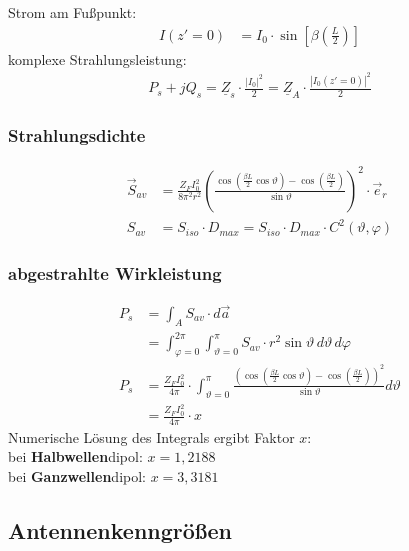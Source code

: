 Strom am Fußpunkt:
\begin{align*}
	I(z'=0) & = I_0\cdot\sin\left[\beta\left(\frac{L}{2}\right)\right]
\end{align*}
komplexe Strahlungsleistung:
\begin{align*}
	P_s +jQ_s = \underline{Z}_s\cdot \frac{|I_0|^2}{2} = \underline{Z}_A \cdot \frac{|I_0(z'=0)|^2}{2}
\end{align*}
\subsubsection{Strahlungsdichte}
\begin{align*}
    \vec{S}_{av} & = \frac{Z_FI_0^2}{8\pi^2 r^2}\left(\frac{\cos\left(\frac{\beta L}{2}\cos\vartheta\right)-\cos\left(\frac{\beta L}{2}\right)}{\sin\vartheta}\right)^2\cdot\vec{e}_r                               \\
    S_{av} & = S_{iso} \cdot D_{max} = S_{iso} \cdot D_{max} \cdot C^2(\vartheta, \varphi)
\end{align*}
\subsubsection{abgestrahlte Wirkleistung}
\begin{align*}
                P_{s} & = \int_A S_{av}\cdot d\vec{a}                                                                                                                                                              \\
                 & = \int^{2\pi}_{\varphi = 0}\int^{\pi}_{\vartheta = 0} S_{av}\cdot r^2 \sin\vartheta \, d\vartheta \, d\varphi\\
 P_{s}          & = \frac{Z_{F}I_0^2}{4\pi}\cdot\int^{\pi}_{\vartheta=0}\frac{\left(\cos\left(\frac{\beta L}{2}\cos\vartheta\right)-\cos\left(\frac{\beta L}{2}\right)\right)^2}{\sin\vartheta}d\vartheta\\
 &= \frac{Z_{F}I_0^2}{4\pi}\cdot x
\end{align*}
Numerische Lösung des Integrals ergibt Faktor $ x $:\\
bei \textbf{Halbwellen}dipol: $ x=1,2188 $\\
bei \textbf{Ganzwellen}dipol: $ x=3,3181$
\subsection{Antennenkenngrößen}



